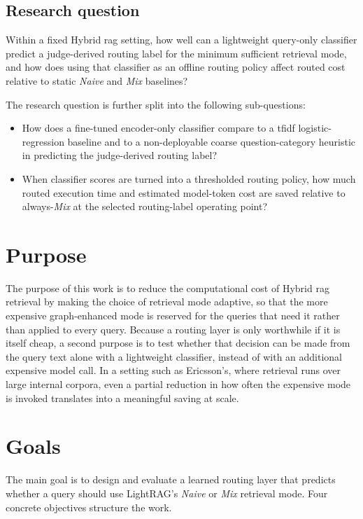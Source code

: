\documentclass[english, bibtex]{kththesis}               %
\numberwithin{listing}{chapter}
\begin{document}
\subsection{Research question}
\label{sec:researchQuestion}

Within a fixed Hybrid \gls{rag} setting, how well can a lightweight query-only classifier predict a judge-derived routing label for the minimum sufficient retrieval mode, and how does using that classifier as an offline routing policy affect routed cost relative to static \emph{Naive} and \emph{Mix} baselines?

The research question is further split into the following sub-questions:

\begin{itemize}
    \item How does a fine-tuned encoder-only classifier compare to a \gls{tfidf} logistic-regression baseline and to a non-deployable coarse question-category heuristic in predicting the judge-derived routing label?
    \item When classifier scores are turned into a thresholded routing policy, how much routed execution time and estimated model-token cost are saved relative to always-\emph{Mix} at the selected routing-label operating point?
\end{itemize}

\section{Purpose}
\label{sec:purpose}
The purpose of this work is to reduce the computational cost of Hybrid \gls{rag} retrieval by making the choice of retrieval mode adaptive, so that the more expensive graph-enhanced mode is reserved for the queries that need it rather than applied to every query. Because a routing layer is only worthwhile if it is itself cheap, a second purpose is to test whether that decision can be made from the query text alone with a lightweight classifier, instead of with an additional expensive model call. In a setting such as Ericsson's, where retrieval runs over large internal corpora, even a partial reduction in how often the expensive mode is invoked translates into a meaningful saving at scale.



\section{Goals}
\label{sec:goals}
The main goal is to design and evaluate a learned routing layer that predicts whether a query should use LightRAG's \emph{Naive} or \emph{Mix} retrieval mode. Four concrete objectives structure the work.
\end{document}
